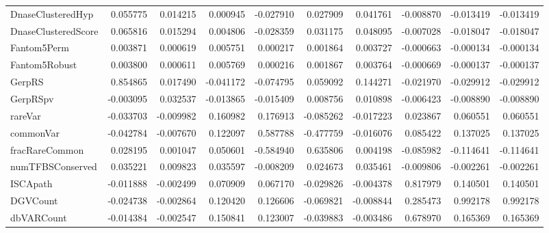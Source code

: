 \begin{tabular}{lrrrrrrrrr}
DnaseClusteredHyp   &  0.055775 &  0.014215 &  0.000945 &  -0.027910 &        0.027909 &          0.041761 & -0.008870 & -0.013419 &   -0.013419 \\
DnaseClusteredScore &  0.065816 &  0.015294 &  0.004806 &  -0.028359 &        0.031175 &          0.048095 & -0.007028 & -0.018047 &   -0.018047 \\
Fantom5Perm         &  0.003871 &  0.000619 &  0.005751 &   0.000217 &        0.001864 &          0.003727 & -0.000663 & -0.000134 &   -0.000134 \\
Fantom5Robust       &  0.003800 &  0.000611 &  0.005769 &   0.000216 &        0.001867 &          0.003764 & -0.000669 & -0.000137 &   -0.000137 \\
GerpRS              &  0.854865 &  0.017490 & -0.041172 &  -0.074795 &        0.059092 &          0.144271 & -0.021970 & -0.029912 &   -0.029912 \\
GerpRSpv            & -0.003095 &  0.032537 & -0.013865 &  -0.015409 &        0.008756 &          0.010898 & -0.006423 & -0.008890 &   -0.008890 \\
rareVar             & -0.033703 & -0.009982 &  0.160982 &   0.176913 &       -0.085262 &         -0.017223 &  0.023867 &  0.060551 &    0.060551 \\
commonVar           & -0.042784 & -0.007670 &  0.122097 &   0.587788 &       -0.477759 &         -0.016076 &  0.085422 &  0.137025 &    0.137025 \\
fracRareCommon      &  0.028195 &  0.001047 &  0.050601 &  -0.584940 &        0.635806 &          0.004198 & -0.085982 & -0.114641 &   -0.114641 \\
numTFBSConserved    &  0.035221 &  0.009823 &  0.035597 &  -0.008209 &        0.024673 &          0.035461 & -0.009806 & -0.002261 &   -0.002261 \\
ISCApath            & -0.011888 & -0.002499 &  0.070909 &   0.067170 &       -0.029826 &         -0.004378 &  0.817979 &  0.140501 &    0.140501 \\
DGVCount            & -0.024738 & -0.002864 &  0.120420 &   0.126606 &       -0.069821 &         -0.008844 &  0.285473 &  0.992178 &    0.992178 \\
dbVARCount          & -0.014384 & -0.002547 &  0.150841 &   0.123007 &       -0.039883 &         -0.003486 &  0.678970 &  0.165369 &    0.165369 \\
\bottomrule
\end{tabular}
